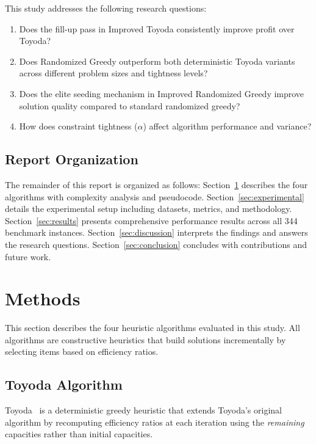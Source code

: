 \documentclass[12pt,a4paper]{article}
\begin{document}
This study addresses the following research questions:

\begin{enumerate}
    \item[\textbf{RQ1:}] Does the fill-up pass in Improved Toyoda consistently improve profit over Toyoda?
    \item[\textbf{RQ2:}] Does Randomized Greedy outperform both deterministic Toyoda variants across different problem sizes and tightness levels?
    \item[\textbf{RQ3:}] Does the elite seeding mechanism in Improved Randomized Greedy improve solution quality compared to standard randomized greedy?
    \item[\textbf{RQ4:}] How does constraint tightness ($\alpha$) affect algorithm performance and variance?
\end{enumerate}

\subsection{Report Organization}

The remainder of this report is organized as follows: Section~\ref{sec:methods} describes the four algorithms with complexity analysis and pseudocode. Section~\ref{sec:experimental} details the experimental setup including datasets, metrics, and methodology. Section~\ref{sec:results} presents comprehensive performance results across all 344 benchmark instances. Section~\ref{sec:discussion} interprets the findings and answers the research questions. Section~\ref{sec:conclusion} concludes with contributions and future work.

\section{Methods}
\label{sec:methods}

This section describes the four heuristic algorithms evaluated in this study. All algorithms are constructive heuristics that build solutions incrementally by selecting items based on efficiency ratios.

\subsection{Toyoda Algorithm}

Toyoda~\cite{toyoda1975simplified} is a deterministic greedy heuristic that extends Toyoda's original algorithm by recomputing efficiency ratios at each iteration using the \emph{remaining} capacities rather than initial capacities.
\end{document}
